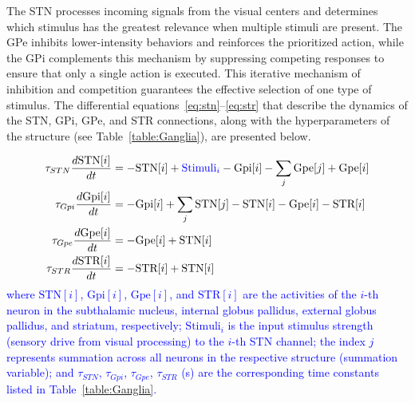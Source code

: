 \documentclass[preprint,12pt]{elsarticle}
\newcommand{\revblue}[1]{\textcolor{blue}{#1}}
\begin{document}
The STN processes incoming signals from the visual centers and determines which stimulus has the greatest relevance when multiple stimuli are present. The GPe inhibits lower-intensity behaviors and reinforces the prioritized action, while the GPi complements this mechanism by suppressing competing responses to ensure that only a single action is executed. This iterative mechanism of inhibition and competition guarantees the effective selection of one type of stimulus. The differential equations~\eqref{eq:stn}–\eqref{eq:str} that describe the dynamics of the STN, GPi, GPe, and STR connections, along with the hyperparameters of the structure (see Table~\ref{table:Ganglia}), are presented below. 

\begin{align}
\tau_{STN}\frac{d \text{STN}[i]}{dt} &= -\text{STN}[i] + \textcolor{blue}{\text{Stimuli}_i} - \text{Gpi}[i] - \sum_{j} \text{Gpe}[j] + \text{Gpe}[i]\label{eq:stn} \\
\tau_{Gpi}\frac{d \text{Gpi}[i]}{dt} &= - \text{Gpi}[i] + \sum_{j} \text{STN}[j]-\text{STN}[i] - \text{Gpe}[i] - \text{STR}[i]\\
\tau_{Gpe}\frac{d \text{Gpe}[i]}{dt} &= - \text{Gpe}[i] + \text{STN}[i] \\
\tau_{STR}\frac{d \text{STR}[i]}{dt} &= - \text{STR}[i] + \text{STN}[i]
\label{eq:str}
\end{align}
\revblue{where $\text{STN}[i]$, $\text{Gpi}[i]$, $\text{Gpe}[i]$, and $\text{STR}[i]$ are the activities of the $i$-th neuron in the subthalamic nucleus, internal globus pallidus, external globus pallidus, and striatum, respectively; $\text{Stimuli}_i$ is the input stimulus strength (sensory drive from visual processing) to the $i$-th STN channel; the index $j$ represents summation across all neurons in the respective structure (summation variable); and $\tau_{STN}$, $\tau_{Gpi}$, $\tau_{Gpe}$, $\tau_{STR}$ (s) are the corresponding time constants listed in Table~\ref{table:Ganglia}.}
\end{document}
